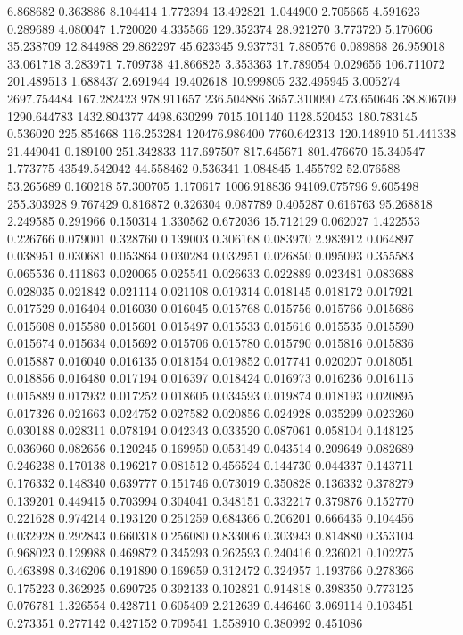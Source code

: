 6.868682
0.363886
8.104414
1.772394
13.492821
1.044900
2.705665
4.591623
0.289689
4.080047
1.720020
4.335566
129.352374
28.921270
3.773720
5.170606
35.238709
12.844988
29.862297
45.623345
9.937731
7.880576
0.089868
26.959018
33.061718
3.283971
7.709738
41.866825
3.353363
17.789054
0.029656
106.711072
201.489513
1.688437
2.691944
19.402618
10.999805
232.495945
3.005274
2697.754484
167.282423
978.911657
236.504886
3657.310090
473.650646
38.806709
1290.644783
1432.804377
4498.630299
7015.101140
1128.520453
180.783145
0.536020
225.854668
116.253284
120476.986400
7760.642313
120.148910
51.441338
21.449041
0.189100
251.342833
117.697507
817.645671
801.476670
15.340547
1.773775
43549.542042
44.558462
0.536341
1.084845
1.455792
52.076588
53.265689
0.160218
57.300705
1.170617
1006.918836
94109.075796
9.605498
255.303928
9.767429
0.816872
0.326304
0.087789
0.405287
0.616763
95.268818
2.249585
0.291966
0.150314
1.330562
0.672036
15.712129
0.062027
1.422553
0.226766
0.079001
0.328760
0.139003
0.306168
0.083970
2.983912
0.064897
0.038951
0.030681
0.053864
0.030284
0.032951
0.026850
0.095093
0.355583
0.065536
0.411863
0.020065
0.025541
0.026633
0.022889
0.023481
0.083688
0.028035
0.021842
0.021114
0.021108
0.019314
0.018145
0.018172
0.017921
0.017529
0.016404
0.016030
0.016045
0.015768
0.015756
0.015766
0.015686
0.015608
0.015580
0.015601
0.015497
0.015533
0.015616
0.015535
0.015590
0.015674
0.015634
0.015692
0.015706
0.015780
0.015790
0.015816
0.015836
0.015887
0.016040
0.016135
0.018154
0.019852
0.017741
0.020207
0.018051
0.018856
0.016480
0.017194
0.016397
0.018424
0.016973
0.016236
0.016115
0.015889
0.017932
0.017252
0.018605
0.034593
0.019874
0.018193
0.020895
0.017326
0.021663
0.024752
0.027582
0.020856
0.024928
0.035299
0.023260
0.030188
0.028311
0.078194
0.042343
0.033520
0.087061
0.058104
0.148125
0.036960
0.082656
0.120245
0.169950
0.053149
0.043514
0.209649
0.082689
0.246238
0.170138
0.196217
0.081512
0.456524
0.144730
0.044337
0.143711
0.176332
0.148340
0.639777
0.151746
0.073019
0.350828
0.136332
0.378279
0.139201
0.449415
0.703994
0.304041
0.348151
0.332217
0.379876
0.152770
0.221628
0.974214
0.193120
0.251259
0.684366
0.206201
0.666435
0.104456
0.032928
0.292843
0.660318
0.256080
0.833006
0.303943
0.814880
0.353104
0.968023
0.129988
0.469872
0.345293
0.262593
0.240416
0.236021
0.102275
0.463898
0.346206
0.191890
0.169659
0.312472
0.324957
1.193766
0.278366
0.175223
0.362925
0.690725
0.392133
0.102821
0.914818
0.398350
0.773125
0.076781
1.326554
0.428711
0.605409
2.212639
0.446460
3.069114
0.103451
0.273351
0.277142
0.427152
0.709541
1.558910
0.380992
0.451086
